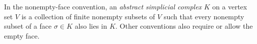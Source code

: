 
In the nonempty-face convention, an \emph{abstract simplicial complex} $K$ on a vertex set $V$ is a collection of finite nonempty subsets of $V$ such that every nonempty subset of a face $\sigma\in K$ also lies in $K$. Other conventions also require or allow the empty face.
